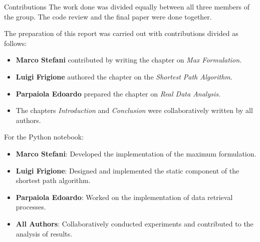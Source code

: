 \begin{projsection}{Contributions}
	The work done was divided equally between all three members of the group. The code review and the final paper were done together.
	
	The preparation of this report was carried out with contributions divided as follows:
	
	\begin{itemize}
		\item \textbf{Marco Stefani} contributed by writing the chapter on \textit{Max Formulation}.
		\item \textbf{Luigi Frigione} authored the chapter on the \textit{Shortest Path Algorithm}.
		\item \textbf{Parpaiola Edoardo} prepared the chapter on \textit{Real Data Analysis}.
		\item The chapters \textit{Introduction} and \textit{Conclusion} were collaboratively written by all authors.
	\end{itemize}
	
	For the Python notebook:	
	\begin{itemize}
		\item \textbf{Marco Stefani}: Developed the implementation of the maximum formulation.
		\item \textbf{Luigi Frigione}: Designed and implemented the static component of the shortest path algorithm.
		\item \textbf{Parpaiola Edoardo}: Worked on the implementation of data retrieval processes.
		\item \textbf{All Authors}: Collaboratively conducted experiments and contributed to the analysis of results.
	\end{itemize}
	
\end{projsection}
